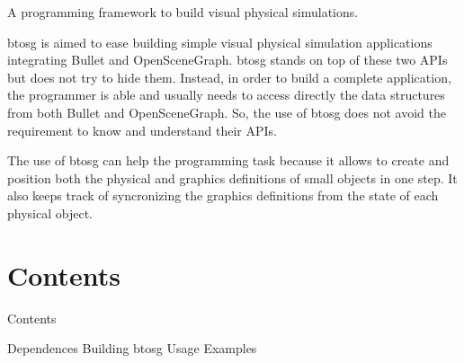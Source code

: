 A programming framework to build visual physical simulations.

btosg is aimed to ease building simple visual physical simulation applications integrating Bullet and Open\+Scene\+Graph. btosg stands on top of these two A\+P\+Is but does not try to hide them. Instead, in order to build a complete application, the programmer is able and usually needs to access directly the data structures from both Bullet and Open\+Scene\+Graph. So, the use of btosg does not avoid the requirement to know and understand their A\+P\+Is.

The use of btosg can help the programming task because it allows to create and position both the physical and graphics definitions of small objects in one step. It also keeps track of syncronizing the graphics definitions from the state of each physical object.\hypertarget{btosg2_contents}{}\section{Contents}\label{btosg2_contents}
Contents

Dependences Building btosg Usage Examples

